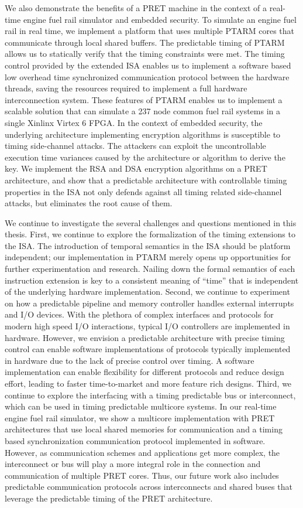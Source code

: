 We also demonstrate the benefits of a PRET machine in the context of a real-time engine fuel rail simulator and embedded security.
To simulate an engine fuel rail in real time, we implement a platform that uses multiple PTARM cores that communicate through local shared buffers. 
The predictable timing of PTARM allows us to statically verify that the timing constraints were met.  
The timing control provided by the extended ISA enables us to implement a software based low overhead time synchronized communication protocol between the hardware threads, saving the resources required to implement a full hardware interconnection system.
These features of PTARM enables us to implement a scalable solution that can simulate a 237 node common fuel rail systems in a single Xinlinx Virtex 6 FPGA. 
In the context of embedded security, the underlying architecture implementing encryption algorithms is susceptible to timing side-channel attacks.
The attackers can exploit the uncontrollable execution time variances caused by the architecture or algorithm to derive the key. 
We implement the RSA and DSA encryption algorithms on a PRET architecture, and show that a predictable architecture with controllable timing properties in the ISA not only defends against all timing related side-channel attacks, but eliminates the root cause of them. 

We continue to investigate the several challenges and questions mentioned in this thesis.
First, we continue to explore the formalization of the timing extensions to the ISA. 
The introduction of temporal semantics in the ISA should be platform independent; our implementation in PTARM merely opens up opportunities for further experimentation and research. 
Nailing down the formal semantics of each instruction extension is key to a consistent meaning of ``time'' that is independent of the underlying hardware implementation. 
Second, we continue to experiment on how a predictable pipeline and memory controller handles external interrupts and I/O devices.     
With the plethora of complex interfaces and protocols for modern high speed I/O interactions, typical I/O controllers are implemented in hardware.
However, we envision a predictable architecture with precise timing control can enable software implementations of protocols typically implemented in hardware due to the lack of precise control over timing.
A software implementation can enable flexibility for different protocols and reduce design effort, leading to faster time-to-market and more feature rich designs.        
Third, we continue to explore the interfacing with a timing predictable bus or interconnect, which can be used in timing predictable multicore systems.
In our real-time engine fuel rail simulator, we show a multicore implementation with PRET architectures that use local shared memories for communication and  a timing based synchronization communication protocol implemented in software.  
However, as communication schemes and applications get more complex, the interconnect or bus will play a more integral role in the connection and communication of multiple PRET cores.
Thus, our future work also includes predictable communication protocols across interconnects and shared buses that leverage the predictable timing of the PRET architecture.     

